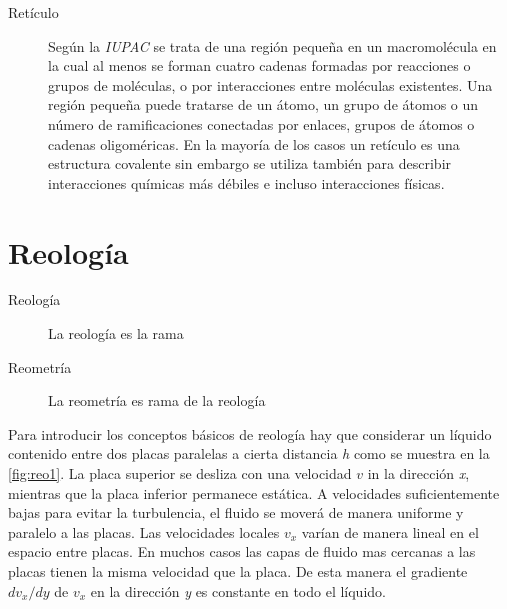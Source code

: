 \begin{description}
\item[Retículo] Según la \emph{IUPAC} \cite{IUPAC2} se trata de una región pequeña en un macromolécula en la cual al menos se forman cuatro cadenas formadas por reacciones o grupos de moléculas, o por interacciones entre moléculas existentes. Una región pequeña puede tratarse de un átomo, un grupo de átomos o un número de ramificaciones conectadas por enlaces, grupos de átomos o cadenas oligoméricas. En la mayoría de los casos un retículo es una estructura covalente sin embargo se utiliza también para describir interacciones químicas más débiles e incluso interacciones físicas.
\end{description}


\section{Reología}
\begin{description}
    \item[Reología] La reología es la rama
    \item[Reometría] La reometría es rama de la reología
\end{description}

Para introducir los conceptos básicos de reología hay que considerar un líquido contenido entre dos placas paralelas a cierta distancia \emph{h} como se muestra en la \autoref{fig:reo1}. La placa superior se desliza con una velocidad $v$ in la dirección \emph{x}, mientras que la placa inferior permanece estática. A velocidades suficientemente bajas para evitar la turbulencia, el fluido se moverá de manera uniforme y paralelo a las placas. Las velocidades locales $v_{x}$ varían de manera lineal en el espacio entre placas. En muchos casos las capas de fluido mas cercanas a las placas tienen la misma velocidad que la placa. De esta manera el gradiente $dv_{x}/{dy}$ de $v_{x}$ en la dirección \emph{y} es constante en todo el líquido.

